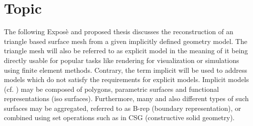 
\section{Topic}

The following Expos\`e and proposed thesis discusses the reconstruction of an triangle based surface mesh from a given implicitly defined geometry model. The triangle mesh will also be referred to as explicit model in the meaning of it being directly usable for popular tasks like rendering for visualization or simulations using finite element methods. Contrary, the term implicit will be used to address models which do not satisfy the requirements for explicit models. Implicit models (cf. \cite{implicit_techniques}) may be composed of polygons, parametric surfaces and functional representations (iso surfaces). Furthermore, many and also different types of such surfaces may be aggregated, referred to as B-rep (boundary representation), or combined using set operations such as in CSG (constructive solid geometry).

